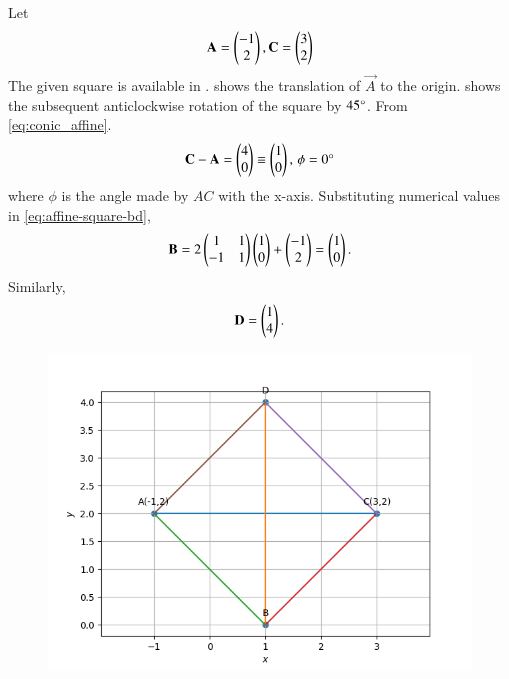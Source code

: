 Let
\begin{align}
\mathbf{A} = \begin{pmatrix}
-1 \\
 2\\
\end{pmatrix},
\mathbf{C} = 
\begin{pmatrix}
3\\
2\\
\end{pmatrix}
\end{align}
The given square is available in .
 shows the translation of $\vec{A}$ to the origin. 
 shows the subsequent anticlockwise rotation of the square by $45\degree$.
From
	\eqref{eq:conic_affine}.
\begin{align}
\mathbf{C} - \mathbf{A} = \begin{pmatrix}
4\\
0
\end{pmatrix} \equiv 
\begin{pmatrix}
1\\
0
\end{pmatrix},\,
\phi= 0\degree
\end{align}
		where
$\phi$ is the angle made by $AC$ with the x-axis.
Substituting numerical values in 
	\eqref{eq:affine-square-bd},
\begin{align}
	\mathbf{B}
	=2\begin{pmatrix}1 & 1 \\ -1 & 1\end{pmatrix}\begin{pmatrix}1\\0\end{pmatrix}+
\begin{pmatrix}
-1 \\
 2\\
\end{pmatrix}
=
\begin{pmatrix}
1\\
0
\end{pmatrix}.
		\end{align}
		Similarly,
\begin{align}
\mathbf{D} = 
\begin{pmatrix}
1\\
4
\end{pmatrix}.
\end{align}
\begin{figure}[!ht]
	\begin{center} 
	    \includegraphics[width=\columnwidth]{chapters/10/7/4/4/figs/square}
	\end{center}
\caption{}
\label{fig:7/4/4/4Fig1}
\end{figure}

